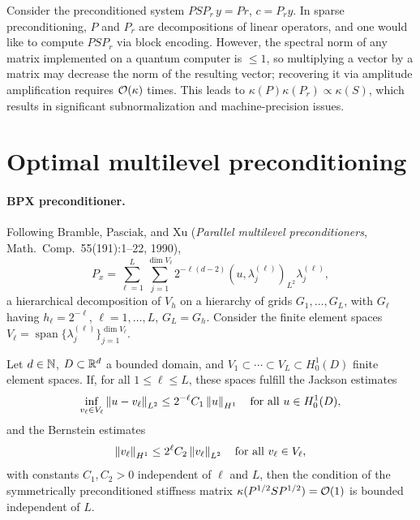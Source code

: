 Consider the preconditioned system $P S P_r\, y = P r$, $c = P_r y$. In sparse
preconditioning, $P$ and $P_r$ are decompositions of linear operators, and one
would like to compute $P S P_r$ via block encoding. However, the spectral norm of
any matrix implemented on a quantum computer is $\le 1$, so multiplying a vector
by a matrix may decrease the norm of the resulting vector; recovering it via
amplitude amplification requires $\mathcal{O}(\kappa)$ times. This leads to
$\kappa(P)\kappa(P_r) \propto \kappa(S)$, which results in significant
subnormalization and machine-precision issues.

\section{Optimal multilevel preconditioning}\label{sec:sec07-bpx}

\paragraph{BPX preconditioner.}
Following Bramble, Pasciak, and Xu (\emph{Parallel multilevel preconditioners},
Math.\ Comp.\ 55(191):1--22, 1990),
\begin{equation}
  P_x = \sum_{\ell=1}^L \sum_{j=1}^{\dim V_\ell} 2^{-\ell(d-2)}(u, \lambda_j^{(\ell)})_{L^2}\lambda_j^{(\ell)},
\end{equation}
a hierarchical decomposition of $V_h$ on a hierarchy of grids
$G_1, \dots, G_L$, with $G_\ell$ having $h_\ell = 2^{-\ell}$, $\ell = 1, \dots, L$,
$G_L = G_h$. Consider the finite element spaces
$V_\ell = \operatorname{span}\{\lambda_j^{(\ell)}\}_{j=1}^{\dim V_\ell}$.

\begin{lemma}
Let $d \in \mathbb{N}$, $D \subset \mathbb{R}^d$ a bounded domain, and
$V_1 \subset \cdots \subset V_L \subset H_0^1(D)$ finite element spaces. If, for
all $1 \le \ell \le L$, these spaces fulfill the Jackson estimates
\begin{equation}
  \inf_{v_\ell \in V_\ell} \left\lVert u - v_\ell \right\rVert_{L^2} \le 2^{-\ell}C_1\left\lVert u \right\rVert_{H^1}
  \quad \text{for all } u \in H_0^1(D),
\end{equation}
and the Bernstein estimates
\begin{equation}
  \left\lVert v_\ell \right\rVert_{H^1} \le 2^\ell C_2\left\lVert v_\ell \right\rVert_{L^2}
  \quad \text{for all } v_\ell \in V_\ell,
\end{equation}
with constants $C_1, C_2 > 0$ independent of $\ell$ and $L$, then the condition of
the symmetrically preconditioned stiffness matrix
$\kappa(P^{1/2} S P^{1/2}) = \mathcal{O}(1)$ is bounded independent of $L$.
\end{lemma}

